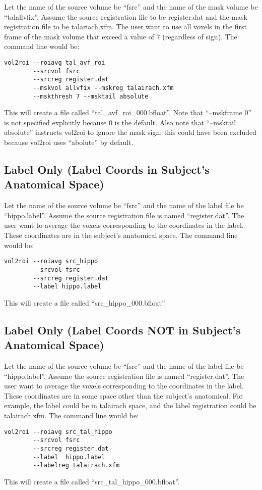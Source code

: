 \documentclass[10pt]{article}
\begin{document}
Let the name of the source volume be ``fsrc'' and the name of the mask
volume be ``talallvfix''.  Assume the source registration file to be
register.dat and the mask registration file to be talariach.xfm.  The
user want to use all voxels in the first frame of the mask volume that
exceed a value of 7 (regardless of sign). The command line would be:
\begin{verbatim}
vol2roi --roiavg tal_avf_roi
        --srcvol fsrc 
        --srcreg register.dat 
        --mskvol allvfix --mskreg talairach.xfm
        --mskthresh 7 --msktail absolute
\end{verbatim}
This will create a file called ``tal\_avf\_roi\_000.bfloat''.  Note that
``--mskframe 0'' is not specified explicitly because 0 is the
default. Also note that ``--msktail absolute'' instructs vol2roi to
ignore the mask sign; this could have been excluded because vol2roi
uses ``abolute'' by default.\\

\subsection{Label Only (Label Coords in Subject's Anatomical Space)}

Let the name of the source volume be ``fsrc'' and the name of the
label file be ``hippo.label''.  Assume the source registration file is
named ``register.dat''. The user want to average the voxels
corresponding to the coordinates in the label. These coordinates are
in the subject's anatomical space. The command line would be:
\begin{verbatim}
vol2roi --roiavg src_hippo
        --srcvol fsrc 
        --srcreg register.dat 
        --label hippo.label
\end{verbatim}
This will create a file called ``src\_hippo\_000.bfloat''.

\subsection{Label Only (Label Coords NOT in Subject's Anatomical Space)}

Let the name of the source volume be ``fsrc'' and the name of the
label file be ``hippo.label''.  Assume the source registration file is
named ``register.dat''. The user want to average the voxels
corresponding to the coordinates in the label. These coordinates are
in some space other than the subject's anatomical. For example, the
label could be in talairach space, and the label registration could be
talairach.xfm. The command line would be:
\begin{verbatim}
vol2roi --roiavg src_tal_hippo
        --srcvol fsrc 
        --srcreg register.dat 
        --label  hippo.label
        --labelreg talairach.xfm
\end{verbatim}
This will create a file called ``src\_tal\_hippo\_000.bfloat''.\\
\end{document}
